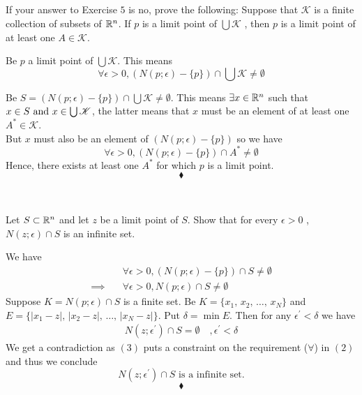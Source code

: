 \subsection{}
\begin{tcolorbox}
If your answer to Exercise $5$ is no, prove the following: Suppose that $\mathscr{K}$ is a finite collection of subsets of $\mathbb{R}^n$. If $p$ is a limit point of $\bigcup \mathscr{K}$ , then $p$ is a limit point of at least one $A \in \mathscr{K}$.
\end{tcolorbox}
Be $p$ a limit point of $\bigcup \mathscr{K}$. This means
$$\forall  \epsilon >0, \left(N(p;\epsilon)-\{p\}\right)\cap \bigcup \mathscr{K}\neq \emptyset$$

Be $S=\left(N(p;\epsilon)-\{p\}\right)\cap \bigcup \mathscr{K}\neq \emptyset$. This means $\exists x\in\mathbb{R}^n$ such that $ x\in S\text{ and } x\in \bigcup\mathscr{K}$, the latter means that $x$ must be an element of at least one $A^{*}\in \mathscr{K}$.\\
But $x$ must also be an element of $\left(N(p;\epsilon)-\{p\}\right)$ so we have 
$$\forall  \epsilon >0, \left(N(p;\epsilon)-\{p\}\right)\cap A^{*}\neq \emptyset$$
Hence, there exists at least one $A^*$ for which $p$ is a limit point.
$$\blacklozenge$$\\

\subsection{}
\begin{tcolorbox}
Let $S\subset \mathbb{R}^n$  and let $z$ be a limit point of $S$. Show that for every $\epsilon > 0$ , $N(z; \epsilon)\cap S$ is an infinite set.
\end{tcolorbox}
We have 
\begin{align}
&\forall  \epsilon >0, \left(N(p;\epsilon)-\{p\}\right)\cap S\neq \emptyset\\
\implies \quad &\forall  \epsilon >0, N(p;\epsilon)\cap S\neq \emptyset
\end{align}
Suppose $K=N(p;\epsilon)\cap S$ is a finite set. Be $K=\{x_1,\, x_2,\, \dots ,\, x_N\}$ and $E=\{|x_1-z|,\, |x_2-z|,\, \dots ,\, |x_N-z|\}$. Put $\delta = \min{E}$. Then for any $\epsilon^{'}<\delta $ we have 
\begin{align}
N(z;\epsilon^{'})\cap S=\emptyset\quad , \epsilon^{'}<\delta 
\end{align}
We get a contradiction as $(3)$ puts a constraint on the requirement ($\forall$) in  $(2)$  and thus we conclude \\
$$N(z;\epsilon^{'})\cap S\text{ is a infinite set.}$$
$$\blacklozenge$$\\

